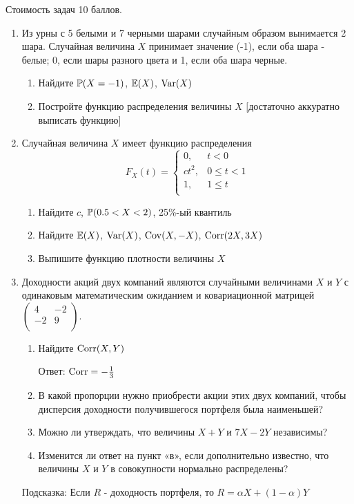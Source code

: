 Стоимость задач 10 баллов.

\begin{enumerate}
\item Из урны с 5 белыми и 7 черными шарами случайным образом вынимается
2 шара. Случайная величина $X$ принимает значение (-1), если оба
шара - белые; 0, если шары разного цвета и 1, если оба шара
черные.
\begin{enumerate}
\item Найдите $\P(X=-1)$, $\E(X)$, $\Var(X)$
\item Постройте функцию распределения величины $X$ $[$достаточно аккуратно выписать функцию$]$
\end{enumerate}

\item Случайная величина $X$ имеет функцию распределения
\[
F_{X}(t)=
\begin{cases}
  0, & t<0 \\
  ct^{2}, & 0\le t <1 \\
  1, & 1\le t \\
\end{cases}
\]
\begin{enumerate}
\item Найдите $c$, $\P(0.5<X<2)$, 25\%-ый квантиль
\item Найдите $\E(X)$, $\Var(X)$, $\Cov(X,-X)$, $\Corr(2X,3X)$
\item Выпишите функцию плотности величины $X$
\end{enumerate}

\item Доходности акций двух компаний являются случайными величинами $X$
и $Y$ с одинаковым математическим ожиданием и ковариационной
матрицей  $\left(%
\begin{array}{cc}
  4 & -2 \\
  -2 & 9 \\
\end{array}%
\right).$
\begin{enumerate}
\item Найдите $\Corr(X,Y)$

Ответ: $\Corr=-\frac{1}{3}$
\item В какой пропорции нужно приобрести акции этих двух
компаний, чтобы дисперсия доходности получившегося портфеля была наименьшей?
\item Можно ли утверждать, что величины $X+Y$ и $7X-2Y$ независимы?
\item Изменится ли ответ на пункт «в», если дополнительно
известно, что величины $X$ и $Y$ в совокупности нормально распределены?
\end{enumerate}
Подсказка: Если $R$ - доходность портфеля, то $R=\alpha
X+(1-\alpha)Y$


\end{enumerate}
